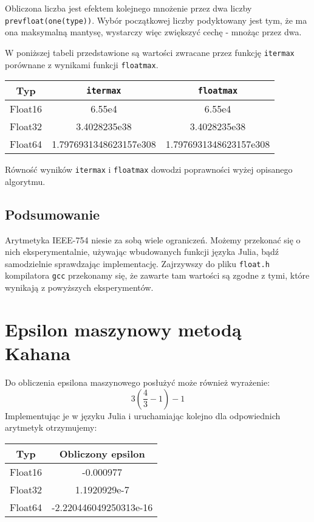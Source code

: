 \documentclass{article}
\begin{document}
Obliczona liczba jest efektem kolejnego mnożenie przez dwa liczby \texttt{prevfloat(one(type))}.
Wybór początkowej liczby podyktowany jest tym, że ma ona maksymalną mantysę, wystarczy więc zwiększyć cechę - mnożąc przez dwa.

W poniższej tabeli przedstawione są wartości zwracane przez funkcję \texttt{itermax} porównane z wynikami funkcji \texttt{floatmax}.

\begin{center}
  \begin{tabular}{| c | c | c |}
    \hline
    Typ & \texttt{itermax} & \texttt{floatmax} \\
    \hline
    Float16 & 6.55e4 & 6.55e4 \\
    Float32 & 3.4028235e38 & 3.4028235e38 \\
    Float64 & 1.7976931348623157e308 & 1.7976931348623157e308 \\
    \hline
  \end{tabular}
\end{center}

Równość wyników \texttt{itermax} i \texttt{floatmax} dowodzi poprawności wyżej opisanego algorytmu.

\subsection{Podsumowanie}

Arytmetyka IEEE-754 niesie za sobą wiele ograniczeń.
Możemy przekonać się o nich eksperymentalnie, używając wbudowanych funkcji języka Julia, bądź samodzielnie sprawdzając implementację.
Zajrzywszy do pliku \texttt{float.h} kompilatora \texttt{gcc} przekonamy się, że zawarte tam wartości są zgodne z tymi, które wynikają z powyższych eksperymentów.


\section{Epsilon maszynowy metodą Kahana}

Do obliczenia epsilona maszynowego posłużyć może również wyrażenie:
$$3(\frac{4}{3} - 1) - 1$$
Implementując je w języku Julia i uruchamiając kolejno dla odpowiednich arytmetyk otrzymujemy:
\begin{center}
  \begin{tabular}{| c | c |}
    \hline
    Typ & Obliczony epsilon \\
    \hline
    Float16 & -0.000977 \\
    Float32 & 1.1920929e-7 \\
    Float64 & -2.220446049250313e-16 \\
    \hline
  \end{tabular}
\end{center}
\end{document}
